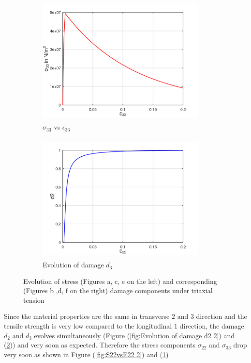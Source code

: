 \documentclass[12pt,a4paper,twoside,openright]{report}
\begin{document}
\begin{figure}[htbp!]\ContinuedFloat
     \begin{subfigure}{0.4\textwidth}
         \includegraphics[width=8.5cm,height=6.5cm]{24.S33vsE33.png}
         \caption{$\sigma_{33}$ vs $\epsilon_{33}$}
         \label{fig:S33vsE33}
     \end{subfigure}
     \hspace{1.5cm}
     \begin{subfigure}{0.4\textwidth}
         \includegraphics[width=8.5cm,height=6.5cm]{24.d2.png}
         \caption{Evolution of damage $d_{3}$}
         \label{fig:Evolution of damage d3}
     \end{subfigure}     
        \caption{Evolution of stress (Figures a, c, e on the left) and corresponding (Figures b ,d, f on the right) damage components under triaxial tension}
        \label{fig:Evolution of damage under triaxial tension}     
\end{figure}
\FloatBarrier
Since the material properties are the same in transverse $2$ and $3$ direction and the tensile strength is very low compared to the longitudinal $1$ direction, the damage $d_{2}$ and $d_{3}$ evolves simultaneously (Figure (\ref{fig:Evolution of damage d2 2}) and (\ref{fig:Evolution of damage d3})) and very soon as expected. Therefore the stress components $\sigma_{22}$ and $\sigma_{33}$ drop very soon as shown in Figure (\ref{fig:S22vsE22 2}) and (\ref{fig:S33vsE33}) 
\end{document}
